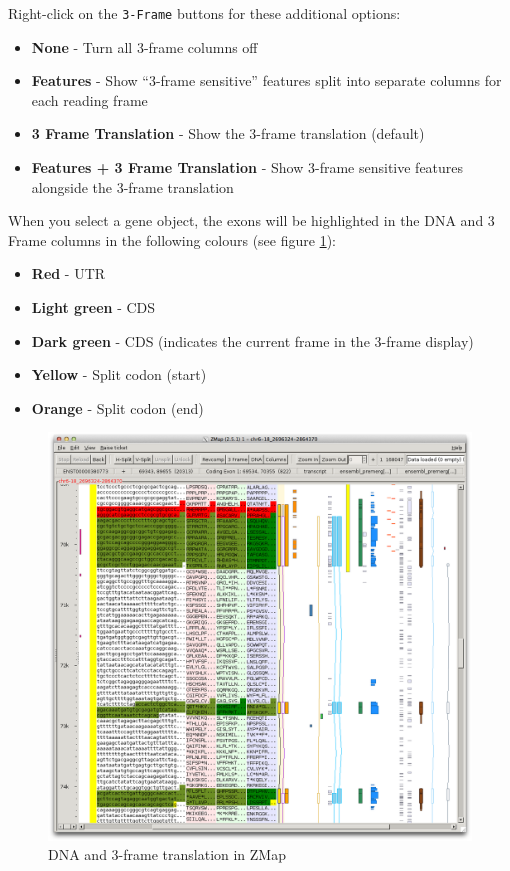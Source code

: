 \documentclass[letterpaper]{article}
\begin{document}
Right-click on the \lstinline{3-Frame} buttons for these additional options:
\begin{itemize}
\item \textbf{None} - Turn all 3-frame columns off
\item \textbf{Features} - Show ``3-frame sensitive'' features split into separate columns for each reading frame
\item \textbf{3 Frame Translation} - Show the 3-frame translation (default)
\item \textbf{Features + 3 Frame Translation} - Show 3-frame sensitive features alongside the 3-frame translation
\end{itemize}

When you select a gene object, the exons will be highlighted in the DNA and 3 Frame columns in the following colours (see figure \ref{img_dna_3_frame}):
\begin{itemize}
\item \textbf{Red} - UTR
\item \textbf{Light green} - CDS
\item \textbf{Dark green} - CDS (indicates the current frame in the 3-frame display)
\item \textbf{Yellow} - Split codon (start)
\item \textbf{Orange} - Split codon (end) 
\end{itemize}

\begin{figure}
\centering
\color[rgb]{0.30980393,0.5058824,0.7411765}
\includegraphics[width=15.231cm]{img_dna_3_frame.png}
\caption{DNA and 3-frame translation in ZMap}
\label{img_dna_3_frame}
\end{figure}
\end{document}
